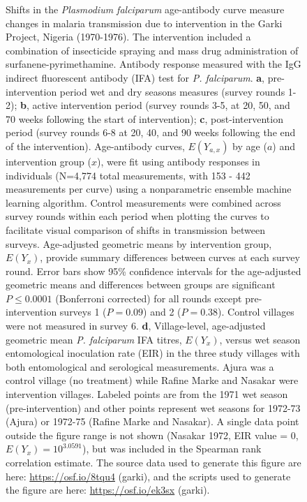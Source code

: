 \documentclass[11pt]{article}
\begin{document}
\begin{figure}[htbp]
\begin{center}
\begin{minipage}{\textwidth}
\caption{Shifts in the \textit{Plasmodium falciparum} age-antibody curve measure changes in malaria transmission due to intervention in the Garki Project, Nigeria (1970-1976). The intervention included a combination of insecticide spraying and mass drug administration of surfanene-pyrimethamine. Antibody response measured with the IgG indirect fluorescent antibody (IFA) test for \textit{P. falciparum}. \textbf{a}, pre-intervention period wet and dry seasons measures (survey rounds 1-2); \textbf{b}, active intervention period (survey rounds 3-5, at 20, 50, and 70 weeks following the start of intervention); \textbf{c}, post-intervention period (survey rounds 6-8 at 20, 40, and 90 weeks following the end of the intervention).  Age-antibody curves, $E(Y_{a,x})$ by age ($a$) and intervention group ($x$), were fit using antibody responses in individuals (N=4,774 total measurements, with 153 - 442 measurements per curve) using a nonparametric ensemble machine learning algorithm. Control measurements were combined across survey rounds within each period when plotting the curves to facilitate visual comparison of shifts in transmission between surveys. Age-adjusted geometric means by intervention group, $E(Y_x)$, provide summary differences between curves at each survey round. Error bars show 95\% confidence intervals for the age-adjusted geometric means and differences between groups are significant $P\leq0.0001$ (Bonferroni corrected) for all rounds except pre-intervention surveys 1 ($P=0.09$) and 2 ($P=0.38$). Control villages were not measured in survey 6. \textbf{d}, Village-level, age-adjusted geometric mean \textit{P. falciparum} IFA titres, $E(Y_x)$, versus wet season entomological inoculation rate (EIR) in the three study villages with both entomological and serological measurements. Ajura was a control village (no treatment) while Rafine Marke and Nasakar were intervention villages.  Labeled points are from the 1971 wet season (pre-intervention) and other points represent wet seasons for 1972-73 (Ajura) or 1972-75 (Rafine Marke and Nasakar). A single data point outside the figure range is not shown (Nasakar 1972, EIR value = 0, $E(Y_x) = 10^{3.0591}$), but was included in the Spearman rank correlation estimate. The source data used to generate this figure are here: \url{https://osf.io/8tqu4} (garki), and the scripts used to generate the figure are here: \url{https://osf.io/ek3sx} (garki).}
\label{fig:garki}
\end{minipage}
\end{center}
\end{figure}
\end{document}
